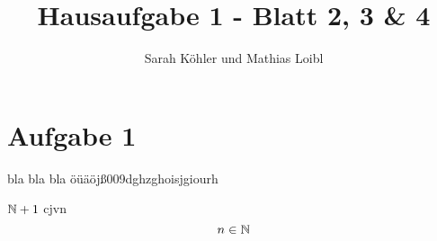 \documentclass[12pt]{amsart}
\title{Hausaufgabe 1 - Blatt 2, 3 \& 4}
\author{Sarah Köhler und Mathias Loibl}
\date{} %
\begin{document}
\maketitle

\section*{Aufgabe 1}
bla bla bla 
öüäöjß009dghzghoisjgiourh

$\mathbb{N} + 1 $ cjvn
\begin{equation*}
n \in \mathbb{N}
\end{equation*}
\end{document}
